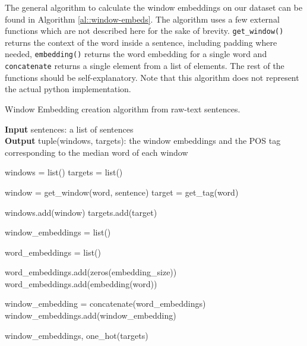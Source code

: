 \documentclass[10pt, a4paper]{article}
\begin{document}
	The general algorithm to calculate the window embeddings on our dataset can be found in Algorithm \ref{al::window-embeds}. The algorithm uses a few external functions which are not described here for the sake of brevity. \texttt{get\_window()} returns the context of the word inside a sentence, including padding where needed, \texttt{embedding()} returns the word embedding for a single word and \texttt{concatenate} returns a single element from a list of elements. The rest of the functions should be self-explanatory.  Note that this algorithm does not represent the actual python implementation.
	
	\begin{algorithm}
		\caption{Window Embedding creation algorithm from raw-text sentences.} 
		\label{al::window-embeds}
		
		\hspace*{\algorithmicindent} \textbf{Input} sentences: a list of sentences \\
		\hspace*{\algorithmicindent} \textbf{Output} tuple(windows, targets): the window embeddings and the POS tag corresponding to the median word of each window
		\begin{algorithmic}[1]	
			\State windows = list()
			\State targets = list()
			
			\State %
			
			
					\State window = get\_window(word, sentence)
					\State target = get\_tag(word)
					
					\State windows.add(window)
					\State targets.add(target)
				\EndFor
			
			\EndFor
			
			\State %
			
			\State window\_embeddings = list()
				
				\State word\_embeddings = list()
				
				
				
						\State word\_embeddings.add(zeros(embedding\_size))
					\Else
						\State word\_embeddings.add(embedding(word))
					\EndIf
					
				\EndFor
					
				\State window\_embedding = concatenate(word\_embeddings)
				\State window\_embeddings.add(window\_embedding)
			\EndFor
		
			\State %
			
			\State \Return window\_embeddings, one\_hot(targets)
			
		\end{algorithmic} 
	\end{algorithm}
\end{document}

